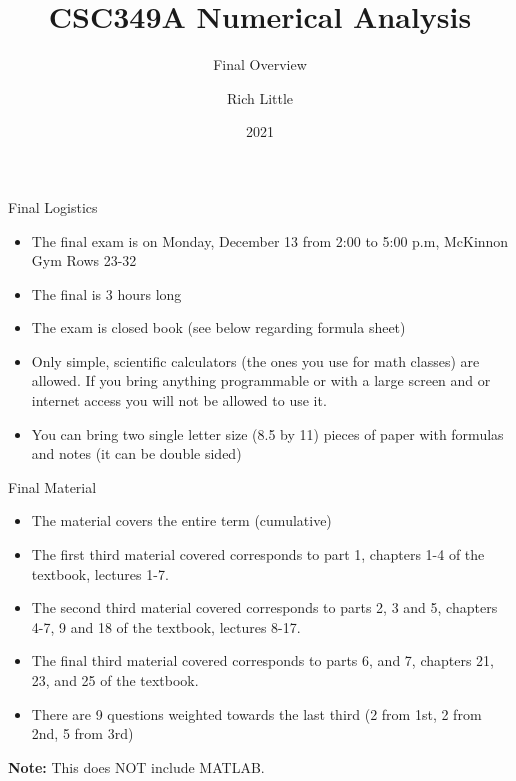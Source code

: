 \documentclass[12pt]{beamer}
\title[CSC349A Numerical Analysis]{CSC349A Numerical Analysis}
\subtitle[Final Overview]{Final Overview}
\date[2021]{2021}
\author[R. Little]{Rich Little}
\institute[University of Victoria]{University of Victoria}
\begin{document}
\frame{\maketitle} %




\begin{frame}{Final Logistics}
\begin{itemize} 

\item{The final exam is on Monday, December 13 from 2:00 to 5:00 p.m, McKinnon Gym Rows 23-32}

\item{The final is 3 hours long}

\item{The exam is closed book (see below regarding formula sheet)}

\item{Only simple, scientific calculators (the ones you use for math classes) are allowed. If you bring anything programmable or with a large screen and or internet access you will not be allowed to use it.}

\item{You can bring two single letter size (8.5 by 11) pieces of paper with formulas and notes (it can be double sided)}

\end{itemize} 

\end{frame} 

\begin{frame}{Final Material} 
\begin{itemize}
\item{The material covers the entire term (cumulative) }
\item{The first third material covered corresponds to part 1, chapters 1-4 of the textbook, lectures 1-7.} 
\item{The second third material covered corresponds to parts 2, 3 and 5, chapters 4-7, 9 and 18 of the textbook, lectures 8-17.} 
\item{The final third material covered corresponds to parts 6, and 7, chapters 21, 23, and 25 of the textbook.}
\item{There are 9 questions weighted towards the last third (2 from 1st, 2 from 2nd, 5 from 3rd)} 
\end{itemize}

{\bf Note:} This does NOT include MATLAB.

\end{frame} 
\end{document}
